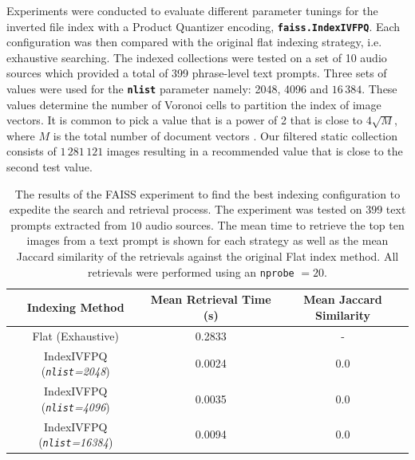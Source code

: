 \documentclass{l4proj}
\begin{document}
Experiments were conducted to evaluate different parameter tunings for the inverted file index with a Product Quantizer encoding, \textbf{\lstinline|faiss.IndexIVFPQ|}. Each configuration was then compared with the original flat indexing strategy, i.e. exhaustive searching. The indexed collections were tested on a set of 10 audio sources which provided a total of 399 phrase-level text prompts. Three sets of values were used for the \textbf{\lstinline|nlist|} parameter namely: 2048, 4096 and $16\,384$. These values determine the number of Voronoi cells to partition the index of image vectors. It is common to pick a value that is a power of 2 that is close to $4\sqrt{M}$, where $M$ is the total number of document vectors \citep{milvus_nlist}. Our filtered static collection consists of $1\,281\,121$ images resulting in a recommended value that is close to the second test value. 

\begin{table}
    \centering
    \begin{tabular}{|c|c|c|}
        \hline
        \textbf{Indexing Method} & \textbf{Mean Retrieval Time (s)} & \textbf{Mean Jaccard Similarity} \\
        \hline
        \hline
        Flat (Exhaustive) & 0.2833 & - \\
        \hline
        IndexIVFPQ (\emph{\lstinline|nlist|=2048}) & 0.0024 & 0.0 \\
        \hline
        IndexIVFPQ (\emph{\lstinline|nlist|=4096}) & 0.0035 & 0.0 \\
        \hline
        IndexIVFPQ (\emph{\lstinline|nlist|=16384}) & 0.0094 & 0.0 \\
        \hline
    \end{tabular}
    
    \caption{ The results of the FAISS experiment to find the best indexing configuration to expedite the search and retrieval process. The experiment was tested on $399$ text prompts extracted from $10$ audio sources. The mean time to retrieve the top ten images from a text prompt is shown for each strategy as well as the mean Jaccard similarity of the retrievals against the original Flat index method. All retrievals were performed using an \lstinline|nprobe| $=20$.}
    \label{tab:faiss_experiment}
\end{table}
\end{document}
